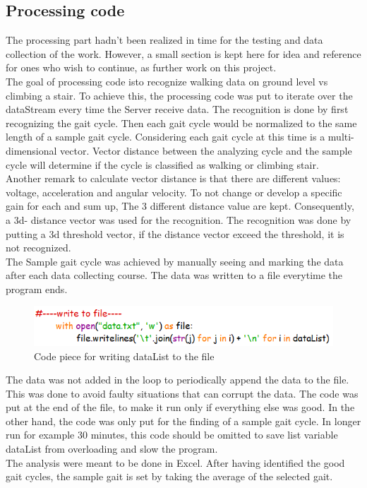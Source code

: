 \documentclass[12 pt, a4paper]{thesis}
\begin{document}
\subsection{Processing code}
The processing part hadn't been realized in time for the testing and data collection of the work. However, a small section is kept here for idea and reference for ones who wish to continue, as further work on this project.\\
The goal of processing code isto recognize walking data on ground level vs climbing a stair. To achieve this, the processing code was put to iterate over the dataStream every time the Server receive data. The recognition is done by first recognizing the gait cycle. Then each gait cycle would be normalized to the same length of a sample gait cycle. Considering each gait cycle at this time is a multi-dimensional vector. Vector distance between the analyzing cycle and the sample cycle will determine if the cycle is classified as walking or climbing stair.\\
Another remark to calculate vector distance is that there are  different values: voltage, acceleration and angular velocity. To not change or develop a specific gain for each and sum up, The 3 different distance value are kept. Consequently, a 3d- distance vector was used for the recognition. The recognition was done by putting a 3d threshold vector, if the distance vector exceed the threshold, it is not recognized.\\
The Sample gait cycle was achieved by manually seeing and marking the data after each data collecting course. The data was written to a file everytime the program ends.
\begin{figure}[hbt!]
\centering
\includegraphics[width = 120mm]{writeFile.png}
\caption{Code piece for writing dataList to the file}
\end{figure}
The data was not added in the loop to periodically append the data to the file. This was done to avoid faulty situations that can corrupt the data. The code was put at the end of the file, to make it run only if everything else was good. In the other hand, the code was only put for the finding of a sample gait cycle. In longer run for example 30 minutes, this code should be omitted to save list variable dataList from overloading and slow the program.\\
The analysis were meant to be done in Excel. After having identified the good gait cycles, the sample gait is set by taking the average of the selected gait.\\
\end{document}
